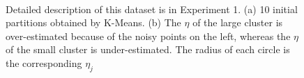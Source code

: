 \documentclass[journal]{IEEEtran}
\theoremstyle{definition}
\begin{document}
\begin{figure}[tb]
\captionsetup[subfloat]{farskip=1pt,captionskip=1pt}%
   \centering
    \\
\caption{Detailed description of this dataset is in Experiment 1. (a) 10 initial partitions obtained by K-Means. (b) The $\eta$ of the large cluster is over-estimated because of the noisy points on the left, whereas the $\eta$ of the small cluster is under-estimated. The radius of each circle is the corresponding $\eta_j$}
\label{fig_eta}
\end{figure}
\end{document}
